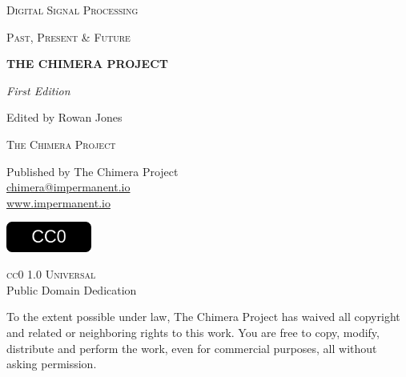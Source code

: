 \newpage
\thispagestyle{empty}
\vspace*{4cm}
\begin{center}

{\fontsize{11}{13}\selectfont\textsc{Digital Signal Processing}}

\vspace{0.3cm}

{\fontsize{11}{13}\selectfont\textsc{Past, Present \& Future}}

\vspace{3cm}

{\fontsize{32}{38}\selectfont\bfseries THE CHIMERA PROJECT}

\vspace*{\fill}

{\Large\textit{First Edition}}

\vspace{1cm}

{\large Edited by Rowan Jones}

\vspace{2cm}

\end{center}
\newpage

\newpage
\thispagestyle{empty}
\vspace*{\fill}
\begin{center}

{\large\textsc{The Chimera Project}}

\vspace{1.5cm}

Published by The Chimera Project\\
\href{mailto:chimera@impermanent.io}{chimera@impermanent.io}\\
\url{www.impermanent.io}

\vspace{2cm}

\includegraphics[width=2.8cm]{graphics/cc-zero.svg}

\vspace{0.8cm}

{\large\textsc{cc0 1.0 Universal}}\\
\vspace{0.3cm}
{\normalsize Public Domain Dedication}

\vspace{1.5cm}

\begin{minipage}{0.75\textwidth}
\centering
{\small To the extent possible under law, The Chimera Project has waived all copyright and related or neighboring rights to this work. You are free to copy, modify, distribute and perform the work, even for commercial purposes, all without asking permission.}
\end{minipage}

\end{center}
\vspace*{\fill}
\newpage
